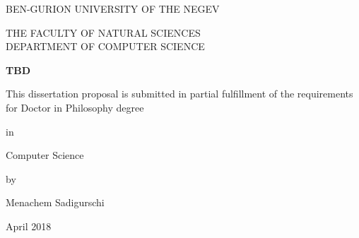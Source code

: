 \begin{titlepage}
\centering
{\normalsize BEN-GURION UNIVERSITY OF THE NEGEV}


{\normalsize THE FACULTY OF NATURAL SCIENCES\\DEPARTMENT OF COMPUTER SCIENCE\par}
\vspace{1.5in}

{\large\bfseries TBD}

\vspace{1.2in}
\begin{normalsize}
This dissertation proposal is submitted in partial
fulfillment of the requirements for
Doctor in Philosophy degree 
\end{normalsize}

\vspace{0.05in}

{\normalsize in}

\vspace{0.05in}

{\normalsize Computer Science }

\vspace{0.05in}

{\normalsize by}

\vspace{0.2in}
{\normalsize Menachem Sadigurschi}
\vspace{0.12in}

 April 2018
 
\end{titlepage}


